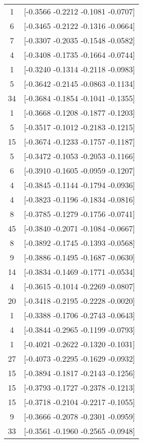 \documentclass[12pt, fullpage,letterpaper]{article}
\begin{document}
\begin{enumerate}
\begin{enumerate}
{\begin{longtable}{|c|c|}
			  1 &  [-0.3566 -0.2212 -0.1081 -0.0707] \\
			  6 &  [-0.3465 -0.2122 -0.1316 -0.0664] \\
			  7 &  [-0.3307 -0.2035 -0.1548 -0.0582] \\
			  4 &  [-0.3408 -0.1735 -0.1664 -0.0744] \\
			  1 &  [-0.3240 -0.1314 -0.2118 -0.0983] \\
			  5 &  [-0.3642 -0.2145 -0.0863 -0.1134] \\
			 34 &  [-0.3684 -0.1854 -0.1041 -0.1355] \\
			  1 &  [-0.3668 -0.1208 -0.1877 -0.1203] \\
			  5 &  [-0.3517 -0.1012 -0.2183 -0.1215] \\
			 15 &  [-0.3674 -0.1233 -0.1757 -0.1187] \\
			  5 &  [-0.3472 -0.1053 -0.2053 -0.1166] \\
			  6 &  [-0.3910 -0.1605 -0.0959 -0.1207] \\
			  4 &  [-0.3845 -0.1144 -0.1794 -0.0936] \\
			  4 &  [-0.3823 -0.1196 -0.1834 -0.0816] \\
			  8 &  [-0.3785 -0.1279 -0.1756 -0.0741] \\
			 45 &  [-0.3840 -0.2071 -0.1084 -0.0667] \\
			  8 &  [-0.3892 -0.1745 -0.1393 -0.0568] \\
			  9 &  [-0.3886 -0.1495 -0.1687 -0.0630] \\
			 14 &  [-0.3834 -0.1469 -0.1771 -0.0534] \\
			  4 &  [-0.3615 -0.1014 -0.2269 -0.0807] \\
			 20 &  [-0.3418 -0.2195 -0.2228 -0.0020] \\
			  1 &  [-0.3388 -0.1706 -0.2743 -0.0643] \\
			  4 &  [-0.3844 -0.2965 -0.1199 -0.0793] \\
			  1 &  [-0.4021 -0.2622 -0.1320 -0.1031] \\
			 27 &  [-0.4073 -0.2295 -0.1629 -0.0932] \\
			 15 &  [-0.3894 -0.1817 -0.2143 -0.1256] \\
			 15 &  [-0.3793 -0.1727 -0.2378 -0.1213] \\
			 15 &  [-0.3718 -0.2104 -0.2217 -0.1055] \\
			  9 &  [-0.3666 -0.2078 -0.2301 -0.0959] \\
			 33 &  [-0.3561 -0.1960 -0.2565 -0.0948] \\

\end{longtable}}
\end{enumerate}
\end{enumerate}
\end{document}
